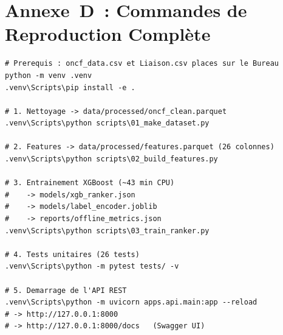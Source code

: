 \documentclass[11pt, a4paper]{article}
\begin{document}
\section{Annexe~D~: Commandes de Reproduction Complète}

\begin{lstlisting}[style=sh]
# Prerequis : oncf_data.csv et Liaison.csv places sur le Bureau
python -m venv .venv
.venv\Scripts\pip install -e .

# 1. Nettoyage -> data/processed/oncf_clean.parquet
.venv\Scripts\python scripts\01_make_dataset.py

# 2. Features -> data/processed/features.parquet (26 colonnes)
.venv\Scripts\python scripts\02_build_features.py

# 3. Entrainement XGBoost (~43 min CPU)
#    -> models/xgb_ranker.json
#    -> models/label_encoder.joblib
#    -> reports/offline_metrics.json
.venv\Scripts\python scripts\03_train_ranker.py

# 4. Tests unitaires (26 tests)
.venv\Scripts\python -m pytest tests/ -v

# 5. Demarrage de l'API REST
.venv\Scripts\python -m uvicorn apps.api.main:app --reload
# -> http://127.0.0.1:8000
# -> http://127.0.0.1:8000/docs   (Swagger UI)
\end{lstlisting}
\end{document}
